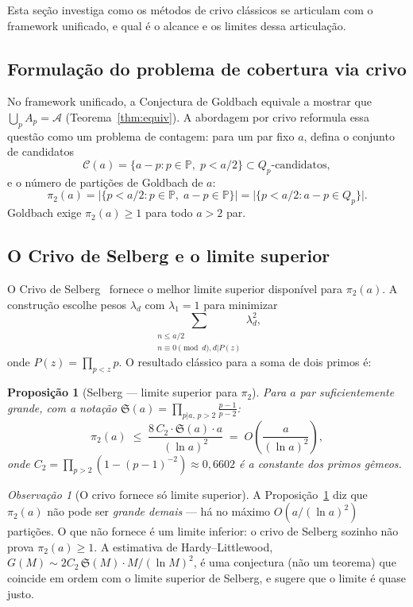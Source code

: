 \documentclass[12pt,a4paper]{article}
\newtheorem{proposition}[theorem]{Proposi\c{c}\~ao}
\theoremstyle{remark}
\newtheorem{remark}[theorem]{Observa\c{c}\~ao}
\newcommand{\calA}{\mathcal{A}}
\newcommand{\bP}{\mathbb{P}}
\begin{document}
	Esta se\c{c}\~ao investiga como os m\'etodos de crivo cl\'assicos se articulam
	com o framework unificado, e qual \'e o alcance e os limites dessa articula\c{c}\~ao.
	
	\subsection{Formula\c{c}\~ao do problema de cobertura via crivo}
	
	No framework unificado, a Conjectura de Goldbach equivale a mostrar que
	$\bigcup_p A_p = \calA$ (Teorema~\ref{thm:equiv}).
	A abordagem por crivo reformula essa quest\~ao como um problema de contagem:
	para um par fixo $a$, defina o conjunto de candidatos
	\[
	\mathcal{C}(a) = \{a - p : p \in \bP,\; p < a/2\} \subset Q_p\text{-candidatos},
	\]
	e o n\'umero de parti\c{c}\~oes de Goldbach de $a$:
	\[
	\pi_2(a) = \bigl|\{p < a/2 : p\in\bP,\; a-p\in\bP\}\bigr|
	= \bigl|\{p < a/2 : a - p \in Q_p\}\bigr|.
	\]
	Goldbach exige $\pi_2(a) \geq 1$ para todo $a > 2$ par.
	
	\subsection{O Crivo de Selberg e o limite superior}
	
	O Crivo de Selberg~\cite{selberg1947} fornece o melhor limite superior dispon\'ivel
	para $\pi_2(a)$.  A constru\c{c}\~ao escolhe pesos $\lambda_d$ com $\lambda_1 = 1$
	para minimizar
	\[
	\sum_{\substack{n \leq a/2 \\ n \equiv 0 \pmod{d}, d|P(z)}} \lambda_d^2,
	\]
	onde $P(z) = \prod_{p < z} p$.  O resultado cl\'assico para a soma de dois primos \'e:
	
	\begin{proposition}[Selberg --- limite superior para $\pi_2$]
		\label{prop:selberg}
		Para $a$ par suficientemente grande, com a nota\c{c}\~ao $\mathfrak{S}(a) = \prod_{p|a,\, p>2}\frac{p-1}{p-2}$:
		\[
		\pi_2(a) \;\leq\; \frac{8\,C_2 \cdot \mathfrak{S}(a) \cdot a}{(\ln a)^2}
		\;=\; O\!\left(\frac{a}{(\ln a)^2}\right),
		\]
		onde $C_2 = \prod_{p>2}(1-(p-1)^{-2}) \approx 0{,}6602$ \'e a constante dos
		primos g\^emeos.
	\end{proposition}
	
	\begin{remark}[O crivo fornece s\'o limite superior]
		A Proposi\c{c}\~ao~\ref{prop:selberg} diz que $\pi_2(a)$ n\~ao pode ser
		\emph{grande demais} --- h\'a no m\'aximo $O(a/(\ln a)^2)$ parti\c{c}\~oes.
		O que n\~ao fornece \'e um limite inferior: o crivo de Selberg sozinho
		n\~ao prova $\pi_2(a) \geq 1$.
		A estimativa de Hardy--Littlewood, $G(M) \sim 2C_2\,\mathfrak{S}(M)\cdot M/(\ln M)^2$,
		\'e uma conjectura (n\~ao um teorema) que coincide em ordem com o limite
		superior de Selberg, e sugere que o limite \'e quase justo.
	\end{remark}
	
\end{document}
